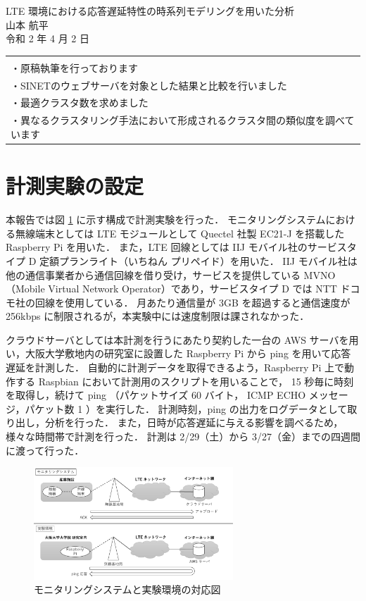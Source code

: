 \documentclass[a4j]{jarticle}
\begin{document}
\newcommand{\argmax}{\mathop{\rm arg~max}\limits}
\def \vector#1{\mbox{\boldmath $#1$}}
\begin{table}[t]
\begin{center}
{\Large LTE 環境における応答遅延特性の時系列モデリングを用いた分析}\\
山本 航平\\
令和 2 年 4 月 2 日
\end{center}
\vspace{1cm}
\begin{tabular}{l}
\hspace{0.5cm}{\large -進捗報告-}\\
・原稿執筆を行っております\\
・SINETのウェブサーバを対象とした結果と比較を行いました\\
・最適クラスタ数を求めました\\
・異なるクラスタリング手法において形成されるクラスタ間の類似度を調べています\\
\end{tabular}
\end{table}

\section{計測実験の設定}
本報告では図 \ref{exp} に示す構成で計測実験を行った．
モニタリングシステムにおける無線端末としては LTE モジュールとして Quectel 社製 EC21-J を搭載した Raspberry Pi を用いた．
また，LTE 回線としては IIJ モバイル社のサービスタイプ D 定額プランライト（いちねん プリペイド）を用いた．
IIJ モバイル社は他の通信事業者から通信回線を借り受け，サービスを提供している MVNO（Mobile Virtual Network Operator）であり，サービスタイプ D では NTT ドコモ社の回線を使用している．
月あたり通信量が 3GB を超過すると通信速度が 256kbps に制限されるが，本実験中には速度制限は課されなかった．

クラウドサーバとしては本計測を行うにあたり契約した一台の AWS サーバを用い，大阪大学敷地内の研究室に設置した Raspberry Pi から ping を用いて応答遅延を計測した．
自動的に計測データを取得できるよう，Raspberry Pi 上で動作する Raspbian において計測用のスクリプトを用いることで， 15 秒毎に時刻を取得し，続けて ping （パケットサイズ 60 バイト， ICMP ECHO メッセージ，パケット数 1 ）を実行した．
計測時刻，ping の出力をログデータとして取り出し，分析を行った．
また，日時が応答遅延に与える影響を調べるため，様々な時間帯で計測を行った．
計測は 2/29（土）から 3/27（金）までの四週間に渡って行った．
\begin{figure}[tb]
\centering
\includegraphics[width=7.5cm]{../figure/experiment.pdf}
\caption{モニタリングシステムと実験環境の対応図}
\label{exp}
\end{figure}
\end{document}
